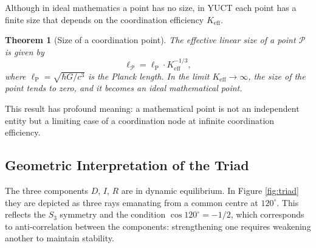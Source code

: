\documentclass[12pt,a4paper]{article}
\newtheorem{theorem}{Theorem}
\newcommand{\Keff}{K_{\mathrm{eff}}}
\newcommand{\calP}{\mathcal{P}}
\newcommand{\ellP}{\ell_{\mathrm{P}}}
\begin{document}
	Although in ideal mathematics a point has no size, in YUCT each point has a finite size that depends on the coordination efficiency \(\Keff\).
	
	\begin{theorem}[Size of a coordination point]
		The effective linear size of a point \(\calP\) is given by
		\[
		\ell_{\calP} = \ellP \cdot \Keff^{-1/3},
		\]
		where \(\ellP = \sqrt{\hbar G / c^3}\) is the Planck length.
		In the limit \(\Keff \to \infty\), the size of the point tends to zero, and it becomes an ideal mathematical point.
	\end{theorem}
	
	This result has profound meaning: a mathematical point is not an independent entity but a limiting case of a coordination node at infinite coordination efficiency.
	
	\subsection{Geometric Interpretation of the Triad}
	
	The three components \(D\), \(I\), \(R\) are in dynamic equilibrium. In Figure \ref{fig:triad} they are depicted as three rays emanating from a common centre at \(120^\circ\). This reflects the \(S_3\) symmetry and the condition \(\cos 120^\circ = -1/2\), which corresponds to anti‑correlation between the components: strengthening one requires weakening another to maintain stability.
	
\end{document}
